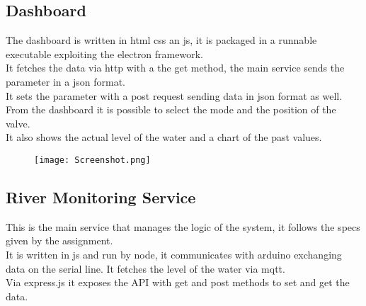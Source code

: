 \subsection{Dashboard}
The dashboard is written in html css an js, it is packaged in a runnable executable exploiting the electron framework.\\
It fetches the data via http with a the get method, the main service sends the parameter in a json format.\\
It sets the parameter with a post request sending data in json format as well. \\
From the dashboard it is possible to select the mode and the position of the valve.\\
It also shows the actual level of the water and a chart of the past values.
\begin{figure}[H]
    \centering
    \texttt{[image: Screenshot.png]}
\end{figure}
\pagebreak
\subsection{River Monitoring Service}
This is the main service that manages the logic of the system, it follows the specs given by the assignment.\\
It is written in js and run by node, it communicates with arduino exchanging data on the serial line. It fetches the level of the water via mqtt.\\
Via express.js it exposes the API with get and post methods to set and get the data.
